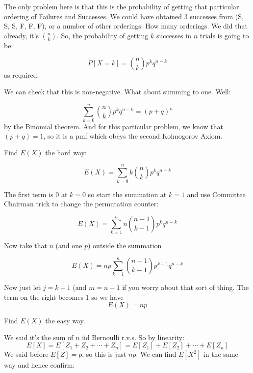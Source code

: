 \documentclass[12pt]{extbook}
\begin{document}
The only problem here is that this is the probability of getting that particular ordering of Failures and Successes.   We could have obtained 3 successes from (S, S, S, F, F, F), or a number of other orderings.   How many orderings.   We did that already, it's $\binom{n}{k}$.   So, the probability of getting $k$ successes in $n$ trials is going to be:

\begin{displaymath}
P[X=k] = \binom{n}{k}p^k q^{n-k}
\end{displaymath}
as required.



We can check that this is non-negative.   What about summing to one.   Well:

\begin{displaymath}
\sum_{k=0}^n \binom{n}{k} p^k q^{n-k} = (p+q)^n
\end{displaymath}
by the Binomial theorem.  And for this particular problem, we know that $(p+q)=1$, so it is a pmf which obeys the second Kolmogorov Axiom.


Find $E(X)$ the hard way:

\begin{displaymath}
E(X) = \sum_{k=0}^n k \binom{n}{k} p^k q^{n-k}
\end{displaymath}

The first term is $0$ at $k=0$ so start the summation at $k=1$ and use Committee Chairman trick to change the permutation counter:

\begin{displaymath}
E(X) = \sum_{k=1}^n  n \binom{n-1}{k-1} p^k q^{n-k} 
\end{displaymath}

Now take that $n$ (and one $p$) outside the summation

\begin{displaymath}
E(X) = np \sum_{k=1}^n   \binom{n-1}{k-1} p^{k-1}q^{n-k}
\end{displaymath}

Now just let $j=k-1$ (and $m=n-1$ if you worry about that sort of thing.   The term on the right becomes $1$ so we have
\begin{displaymath}
E(X) = np
\end{displaymath}



Find $E(X)$ the easy way.

We said it's the sum of $n$ iid Bernoulli r.v.s.   So by linearity:
\begin{displaymath}
E[X] = E[Z_1 + Z_2 + \cdots + Z_n] = E[Z_1] + E[Z_2] + \cdots + E[Z_n]
\end{displaymath}
We said before $E[Z] = p$, so this is just $np$.   We can find $E[X^2]$ in the same way and hence confirm:
\end{document}
